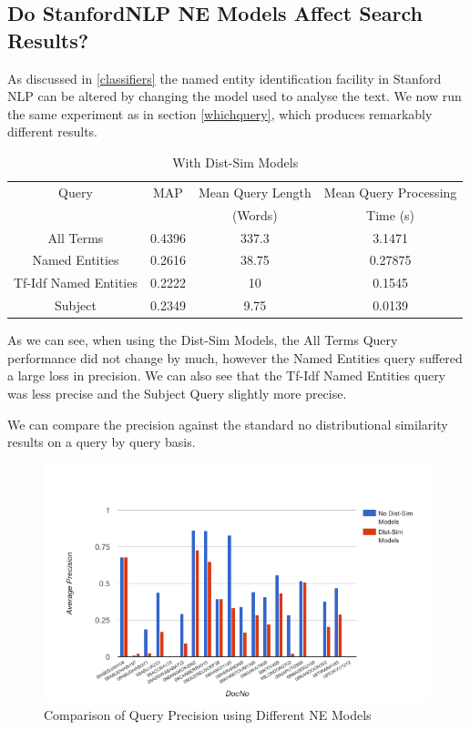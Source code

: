 \documentclass{l4proj}
\begin{document}
\subsection{Do StanfordNLP NE Models Affect Search Results?} \label{distsim}
As discussed in \ref{classifiers} the named entity identification facility in Stanford NLP can be altered by changing the model used to analyse the text. We now run the same experiment as in section \ref{whichquery}, which produces remarkably different results.
\begin{center}
\begin{table}[h]
\centering
\begin{tabular}{|c|c|c|c|}
\hline
Query                 & MAP    & Mean Query Length & Mean Query Processing \\ 
& & (Words) & Time (s) \\\hline
All Terms             & 0.4396 & 337.3             & 3.1471                       \\ \hline
Named Entities        & 0.2616 & 38.75             & 0.27875                         \\ \hline
Tf-Idf Named Entities & 0.2222 & 10                & 0.1545                       \\ \hline
Subject               & 0.2349 & 9.75              & 0.0139                        \\ \hline
\end{tabular}
\caption{With Dist-Sim Models}
\label{results}
\end{table}
\end{center}

As we can see, when using the Dist-Sim Models, the All Terms Query performance did not change by much, however the Named Entities query suffered a large loss in precision. We can also see that the Tf-Idf Named Entities query was less precise and the Subject Query slightly more precise.

We can compare the precision against the standard no distributional similarity results on a query by query basis.

\begin{figure}[H]
\centering
\includegraphics[scale=0.60]{images/query_by_query}
\caption{Comparison of Query Precision using Different NE Models}
\label{query_by_query}
\end{figure}
\end{document}
